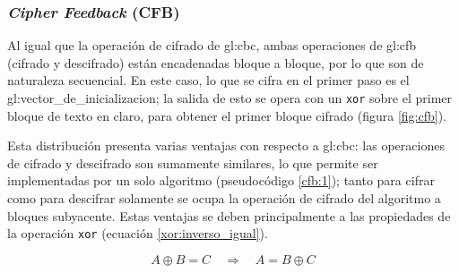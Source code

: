 %
%

\subsubsection{\textit{Cipher Feedback} (CFB)}

Al igual que la operación de cifrado de \acrshort{gl:cbc}, ambas operaciones
de \acrshort{gl:cfb} (cifrado y descifrado) están encadenadas bloque a bloque,
por lo que son de naturaleza secuencial. En este caso, lo que se cifra en el
primer paso es el \gls{gl:vector_de_inicializacion}; la salida de esto se opera
con un \verb|xor| sobre el primer bloque de texto en claro, para obtener el
primer bloque cifrado (figura \ref{fig:cfb}).

Esta distribución presenta varias ventajas con respecto a \acrshort{gl:cbc}:
las operaciones de cifrado y descifrado son sumamente similares, lo que permite
ser implementadas por un solo algoritmo (pseudocódigo \ref{cfb:1}); tanto para
cifrar como para descifrar solamente se ocupa la operación de cifrado del
algoritmo a bloques subyacente. Estas ventajas se deben principalmente a las
propiedades de la operación \verb|xor| (ecuación \ref{xor:inverso_igual}).

\begin{equation}
  \label{xor:inverso_igual}
  A \oplus B = C \quad \Rightarrow \quad A = B \oplus C
\end{equation}

